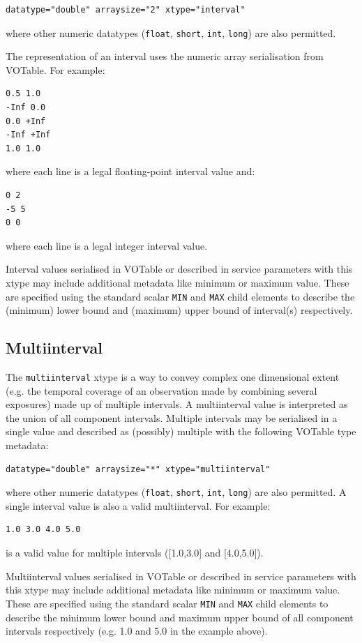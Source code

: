 \documentclass[11pt,letter]{ivoa}
\begin{document}
\begin{verbatim}
datatype="double" arraysize="2" xtype="interval"
\end{verbatim}
\noindent where other numeric datatypes (\verb|float|, \verb|short|, \verb|int|, \verb|long|)
are also permitted.

The representation of an interval uses the numeric array serialisation from
VOTable. For example:

\begin{verbatim}
0.5 1.0
-Inf 0.0
0.0 +Inf
-Inf +Inf
1.0 1.0
\end{verbatim}
\noindent where each line is a legal floating-point interval value and:

\begin{verbatim}
0 2
-5 5
0 0
\end{verbatim}
\noindent  where each line is a legal integer interval value.

Interval values serialised in VOTable or described in service parameters
with this xtype may include additional metadata like minimum
or maximum value. These are specified using the standard scalar \verb|MIN| and
\verb|MAX| child elements to describe the (minimum) lower bound and (maximum)
upper bound of interval(s) respectively.

\subsection{Multiinterval}
The \verb|multiinterval| xtype is a way to convey complex one dimensional extent
(e.g. the temporal coverage of an observation made by combining several exposures)
made up of multiple intervals. A multiinterval value is interpreted as the union
of all component intervals. Multiple intervals may be serialised in a single value and
described as (possibly) multiple with the following VOTable type metadata:

\begin{verbatim}
datatype="double" arraysize="*" xtype="multiinterval"
\end{verbatim}
\noindent where other numeric datatypes (\verb|float|, \verb|short|, \verb|int|, \verb|long|)
are also permitted. A single interval value is also a valid multiinterval. For example:

\begin{verbatim}
1.0 3.0 4.0 5.0
\end{verbatim}
\noindent is a valid value for multiple intervals ([1.0,3.0] and [4.0,5.0]).

Multiinterval values serialised in VOTable or described in service parameters
with this xtype may include additional metadata like minimum
or maximum value. These are specified using the standard scalar \verb|MIN| and
\verb|MAX| child elements to describe the minimum lower bound and maximum
upper bound of all component intervals respectively (e.g. 1.0 and 5.0 in the example
above).
\end{document}
